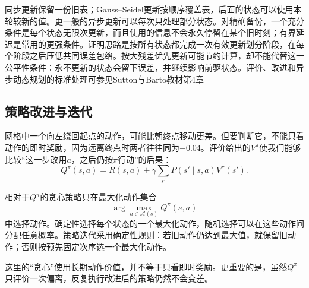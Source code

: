 同步更新保留一份旧表；Gauss--Seidel更新按顺序覆盖表，后面的状态可以使用本轮较新的值。更一般的异步更新可以每次只处理部分状态。对精确备份，一个充分条件是每个状态无限次更新，而且使用的信息不会永久停留在某个旧时刻；有界延迟是常用的更强条件。证明思路是按所有状态都完成一次有效更新划分阶段，在每个阶段之后压低共同误差包络。按大残差优先更新可能节约计算，却不能代替这一公平性条件：永不更新的状态会留下误差，并继续影响前驱状态。评价、改进和异步动态规划的标准处理可参见Sutton与Barto教材第4章

\subsection{策略改进与迭代}
\label{sec:rl-planning-policy-iteration}

网格中一个向左绕回起点的动作，可能比朝终点移动更差。但要判断它，不能只看动作的即时奖励，因为远离终点时两者往往同为$-0.04$。评价给出的$V^\pi$使我们能够比较“这一步改用$a$，之后仍按$\pi$行动”的后果：
\[
 Q^\pi(s,a)=R(s,a)+\gamma\sum_{s'}P(s'\mid s,a)V^\pi(s').
\]

\begin{definition}[贪心策略]
 \label{def:rl-planning-greedy}
 相对于$Q^\pi$的贪心策略只在最大化动作集合
 \[
  \arg\max_{a\in\mathcal A(s)}Q^\pi(s,a)
 \]
 中选择动作。确定性选择每个状态的一个最大化动作，随机选择可以在这些动作间分配任意概率。策略迭代采用确定性规则：若旧动作仍达到最大值，就保留旧动作；否则按预先固定次序选一个最大化动作。
\end{definition}

这里的“贪心”使用长期动作价值，并不等于只看即时奖励。更重要的是，虽然$Q^\pi$只评价一次偏离，反复执行改进后的策略仍然不会变差。

